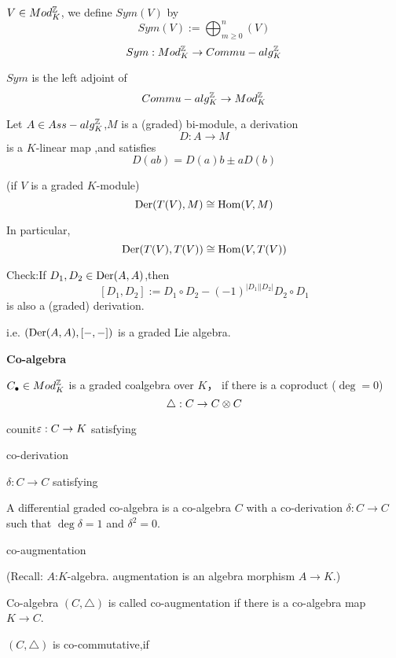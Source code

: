 \begin{definition}
$V\in Mod_K^{\mathbb{Z}}$, we define $Sym(V)$ by
$$Sym(V):=\bigoplus_{m\geq 0}^n(V)$$
$$Sym:Mod_K^{\mathbb{Z}}\to Commu-alg_K^{\mathbb{Z}}$$
\end{definition}

\begin{prop}
$Sym$ is the left adjoint of 
$$Commu-alg_K^{\mathbb{Z}}\to Mod_K^{\mathbb{Z}}$$
\end{prop}

Let $A\in Ass-alg_K^{\mathbb{Z}}$,$M$ is a (graded) bi-module,
a derivation 
$$D:A\to M$$
is a $K$-linear map ,and satisfies 
$$D(ab)=D(a)b\pm aD(b)$$


\begin{prop}(if $V$ is a graded $K$-module)
$$\operatorname{Der}(T(V),M)\cong\operatorname{Hom}(V,M)$$
\end{prop}

In particular, 
$$\operatorname{Der}(T(V),T(V))\cong\operatorname{Hom}(V,T(V))$$

Check:If $D_1,D_2\in\operatorname{Der}(A,A)$,then
$$[D_1,D_2]:=D_1\circ D_2-(-1)^{|D_1||D_2|}D_2\circ D_1$$
is also a (graded) derivation.

i.e. $(\operatorname{Der}(A,A),[-,-])$ is a graded Lie algebra.

\textbf{Co-algebra}

\begin{definition}
$C_{\bullet}\in Mod_K^{\mathbb{Z}}$ is a graded coalgebra over $K$，
if there is a coproduct ($\deg=0$)
$$\triangle:C\to C\otimes C$$
\end{definition}

counit$\varepsilon:C\to K$ satisfying

co-derivation

$\delta: C\to C$ satisfying

A differential graded co-algebra is a co-algebra 
$C$ with a co-derivation $\delta:C\to C$ such that 
$\deg\delta=1$ and $\delta^2=0$.

co-augmentation

 (Recall:
 $A$:$K$-algebra. augmentation is an algebra morphism
$A\to K$.)

Co-algebra $(C,\triangle)$ is called co-augmentation if 
there is a co-algebra map $K\to C$.

$(C,\triangle)$ is co-commutative,if 

